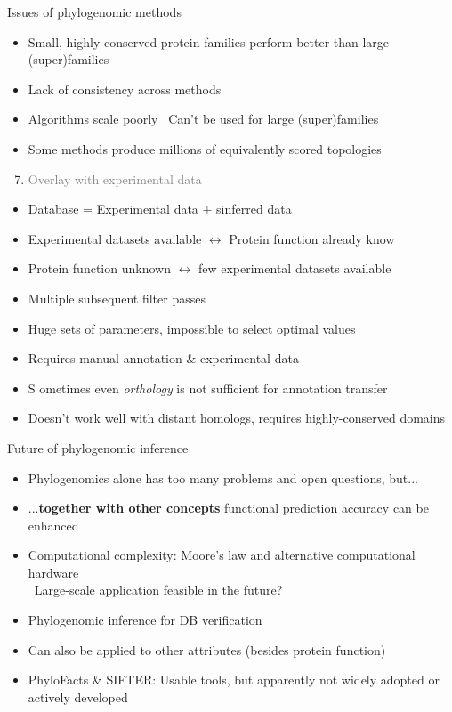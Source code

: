 \documentclass[14pt,xcolor=dvipsnames,pdftex]{beamer}
\begin{document}
\begin{frame}[allowframebreaks]{Issues of phylogenomic methods}
\begin{itemize}
  \item Small, highly-conserved protein families perform better than large (super)families
  \item Lack of consistency across methods
  \item Algorithms scale poorly
  \textrightarrow\ Can't be used for large (super)families
  \item Some methods produce millions of equivalently scored topologies
 \end{itemize}
 \framebreak
 \begin{enumerate}
  \setcounter{enumi}{6}
  \item \textcolor{gray}{Overlay with experimental data}
 \end{enumerate}
 \begin{itemize}
  \item Database = Experimental data + sinferred data
  \item Experimental datasets available
        $\leftrightarrow$ Protein function already know
  \item Protein function unknown $\leftrightarrow$ few experimental datasets available
 \end{itemize}
 \framebreak
 \begin{itemize}
  \item Multiple subsequent filter passes
  \item Huge sets of parameters, impossible to select optimal values
  \item Requires manual annotation \& experimental data
  \item S	ometimes even \textit{orthology} is not sufficient for annotation transfer
  \item Doesn't work well with distant homologs, requires highly-conserved domains
  \end{itemize}
\end{frame}

\begin{frame}{Future of phylogenomic inference}
 \begin{itemize}
  \item Phylogenomics alone has too many problems and open questions, but...
  \pause
  \item ...\textbf{together with other concepts} functional prediction accuracy can be enhanced
  \item Computational complexity: Moore's law and alternative computational hardware\\
  \textrightarrow\ Large-scale application feasible in the future?
  \item Phylogenomic inference for DB verification
  \item Can also be applied to other attributes (besides protein function)
  \item PhyloFacts \& SIFTER: Usable tools, but apparently not widely adopted or actively developed
 \end{itemize}
\end{frame}
\end{document}
